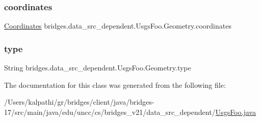 \subsubsection{\texorpdfstring{coordinates}{coordinates}}
{\footnotesize\ttfamily \mbox{\hyperlink{classbridges_1_1data__src__dependent_1_1_usgs_foo_1_1_geometry_1_1_coordinates}{Coordinates}} bridges.\+data\+\_\+src\+\_\+dependent.\+Usgs\+Foo.\+Geometry.\+coordinates}

\mbox{\label{classbridges_1_1data__src__dependent_1_1_usgs_foo_1_1_geometry_a985b3a46dad2fcd4e798d2f51198bcfd}} 
\subsubsection{\texorpdfstring{type}{type}}
{\footnotesize\ttfamily String bridges.\+data\+\_\+src\+\_\+dependent.\+Usgs\+Foo.\+Geometry.\+type}



The documentation for this class was generated from the following file\+:\begin{DoxyCompactItemize}
\item 
/\+Users/kalpathi/gr/bridges/client/java/bridges-\/17/src/main/java/edu/uncc/cs/bridges\+\_\+v21/data\+\_\+src\+\_\+dependent/\mbox{\hyperlink{_usgs_foo_8java}{Usgs\+Foo.\+java}}\end{DoxyCompactItemize}
